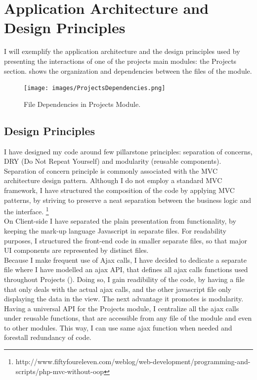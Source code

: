 \section{Application Architecture and Design Principles}

I will exemplify the application architecture and the design principles used by presenting the interactions of one of the projects main modules: the Projects section.  shows the organization and dependencies between the files of the module. 

\begin{figure}
\texttt{[image: images/ProjectsDependencies.png]}
\caption{File Dependencies in Projects Module.}
\label{fig:file_dependencies_projects}
\end{figure}

\subsection{Design Principles}



I have designed my code around few pillarstone principles: separation of concerns, DRY (Do Not Repeat Yourself) and modularity (reusable components). Separation of concern principle is commonly associated with the MVC architecture design pattern. Although I do not employ a standard MVC framework, I have structured the composition of the code by applying MVC patterns, by striving to preserve a neat separation between the business logic and the interface. \footnote{http://www.fiftyfoureleven.com/weblog/web-development/programming-and-scripts/php-mvc-without-oop}\\ 

On Client-side I have separated the plain presentation from functionality, by keeping the mark-up language  Javascript in separate files. For readability purposes, I structured the front-end code in smaller separate files, so that major UI components are represented by distinct files.\\ 

Because I make frequent use of Ajax calls, I have decided to dedicate a separate file where I have modelled an ajax API, that defines all ajax calls functions used throughout Projects (). Doing so, I gain readibility of the code, by having a   file that only deals with the actual ajax calls, and the other javascript file only displaying the data in the view. The next advantage  it promotes is modularity. Having a universal  API for the Projects module, I centralize all the ajax calls under reusable functions, that are accessible from any file of the module and even to other modules. This way, I can use same ajax function when needed and forestall redundancy of code. \\ 

